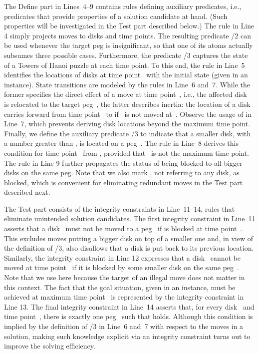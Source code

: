 The Define part in Lines~4--9 contains
rules defining auxiliary predicates, i.e.,
predicates that provide properties of a solution candidate at hand.
(Such properties will be investigated in the Test part described below.)
The rule in Line 4 simply projects moves to disks and time points.
The resulting predicate /$2$ can be used whenever the target peg
is insignificant, so that one of its atoms actually subsumes three possible cases.
Furthermore,
the predicate /$3$ captures the state of a Towers of Hanoi puzzle at each time point.
To this end,
the rule in Line~5 identifies the locations of disks at time point~
with the initial state (given in an instance).
State transitions are modeled by the rules in Line~6 and~7.
While the former specifies the direct effect of a move at time point~, i.e.,
the affected disk~ is relocated to the target peg~,
the latter describes inertia:
the location of a disk~
carries forward from time point~ to 
if~ is not moved at~.
Observe the usage of  in Line~7,
which prevents deriving disk locations beyond the maximum time point.
Finally, we define the auxiliary predicate /$3$ to
indicate that a smaller disk, with a number greater than , is
located on a peg~.
The rule in Line~8 derives this condition for time point~
from ,
provided that~ is not the maximum time point.
The rule in Line 9 further propagates the status of being blocked
to all bigger disks on the same peg.
Note that we also mark , not referring to any disk, as blocked,
which is convenient for eliminating redundant moves
in the Test part described next.

The Test part consists of the integrity constraints in Line~11--14,
rules that eliminate unintended solution candidates.
The first integrity constraint in Line~11 asserts 
that a disk~ must not be moved to a peg~
if  is blocked at time point~.
This excludes moves putting a bigger disk on top of a smaller one and,
in view of the definition of /$3$,
also disallows that a disk is put back to its previous location.
Similarly, the integrity constraint in Line 12 
expresses that a disk~ cannot be moved at time point~
if it is blocked by some smaller disk on the same peg~.
Note that we use  here because the
target of an illegal move does not matter in this context.
The fact that the goal situation, given in an instance,
must be achieved at maximum time point~
is represented by the integrity constraint in Line 13.
The final integrity constraint in Line~14
asserts that, for every disk~ and time point~, 
there is exactly one peg~ such that
 holds.
Although this condition is implied by the definition of /$3$ in Line~6 and~7
with respect to the moves in a solution,
making such knowledge explicit via an integrity constraint
turns out to improve the solving efficiency.

